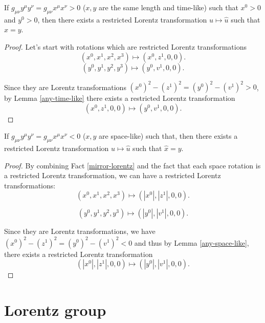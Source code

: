 \documentclass[main.tex]{subfiles}
\begin{document}
\begin{fact}
If $g_{\mu\nu} y^\mu y^\nu = g_{\mu\nu} x^\mu x^\nu > 0$ ($x, y$ are the same length and time-like) such that $x^0 > 0$ and $y^0 > 0$, then there exists a restricted Lorentz transformation $u \mapsto \hat{u}$ such that $\hat{x} = y$.
\end{fact}
\begin{proof}
Let's start with rotations which are restricted Lorentz transformations
\begin{equation}
(x^0, x^1, x^2, x^3) \mapsto (x^0, z^1, 0, 0).
\end{equation}
\begin{equation}
(y^0, y^1, y^2, y^3) \mapsto (y^0, v^1, 0, 0).
\end{equation}

Since they are Lorentz transformations $(x^0)^2 - (z^1)^2 = (y^0)^2 - (v^1)^2 > 0$,
by Lemma \ref{any-time-like} there exists a restricted Lorentz transformation
\begin{equation}
(x^0, z^1, 0, 0) \mapsto (y^0, v^1, 0, 0).
\end{equation}
\end{proof}

\begin{fact}
If $g_{\mu\nu} y^\mu y^\nu = g_{\mu\nu} x^\mu x^\nu < 0$ ($x, y$ are space-like) such that, then there exists a restricted Lorentz transformation $u \mapsto \hat{u}$ such that $\hat{x} = y$.
\end{fact}
\begin{proof}
By combining Fact \ref{mirror-lorentz} and the fact that each space rotation is a restricted Lorentz transformation, we can have a restricted Lorentz transformations:
\begin{equation}
(x^0, x^1, x^2, x^3) \mapsto (|x^0|, |z^1|, 0, 0).
\end{equation}

\begin{equation}
(y^0, y^1, y^2, y^3) \mapsto (|y^0|, |v^1|, 0, 0).
\end{equation}

Since they are Lorentz transformations, we have $(x^0)^2 - (z^1)^2 = (y^0)^2 - (v^1)^2 < 0$ and thus by Lemma \ref{any-space-like}, there exists a restricted Lorentz transformation
\begin{equation}
(|x^0|, |z^1|, 0, 0) \mapsto (|y^0|, |v^1|, 0, 0).
\end{equation}
\end{proof}  

\section{Lorentz group}
\end{document}

